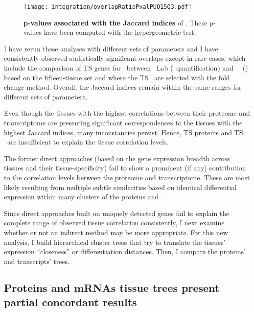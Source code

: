 \begin{figure}[!ht]
    \texttt{[image: integration/overlapRatioPvalPUQ15Q3.pdf]}\centering
    \vspace{-3mm}
    \caption[p-values associated with the Jaccard indices]{%
\label{fig:JaccardPvalues}\label{fig:pJacquard}%
    \textbf{p-values associated with the Jaccard indices} of .
    These p-values have been computed with the hypergeometric test.}
    \vspace{-3mm}
\end{figure}

I have rerun these analyses with different sets of parameters
and I have consistently observed statistically significant overlaps
except in rare cases,
which include the comparison of \gls{TS} genes for  \bladder\
between \pandey\ Lab (\PPKM\ quantification) and \uhlen\ \etal\ (\htseq)
based on the fifteen-tissue set and where the \gls{TS} \mRNAs\ are selected
with the fold change method.
Overall, the Jaccard indices remain within the same ranges
for different sets of parameters.

Even though the tissues with the highest correlations
between their proteome and transcriptome
are presenting significant correspondences
to the tissues with the highest Jaccard indices,
many inconstancies persist.
Hence, \gls{TS} proteins and \gls{TS} \mRNAs\ are insufficient to explain
the tissue correlation levels.

\vspace{-1.5mm}
The former direct approaches
(based on the gene expression breadth across tissues and their tissue-specificity)
fail to show a prominent (if any) contribution to the correlation levels
between the proteome and transcriptome.
These are most likely resulting
from multiple subtle similarities
based on identical differential expression
within many clusters of the proteins and \mRNAs{}.

\vspace{-1.5mm}
Since direct approaches built on uniquely detected genes
fail to explain the complete range of observed tissue correlation consistently,
I next examine whether or not an indirect method may be more appropriate.
For this new analysis,
I build hierarchical cluster trees that try to translate
the tissues' expression \enquote{closeness} or differentiation distances.
Then, I compare the proteins' and transcripts' trees.\mybr\

\subsection{Proteins and mRNAs tissue trees present partial concordant results\\}
\vspace{-12mm}

